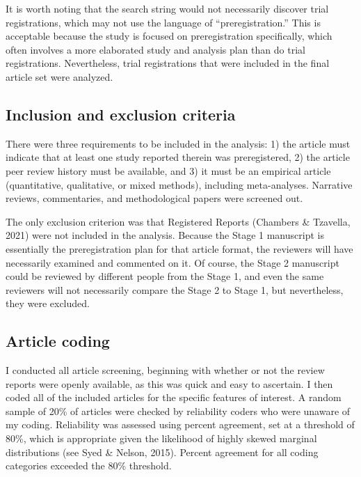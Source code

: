 \documentclass[authordate, empirical]{jote-new-article}
\begin{document}
	It is worth noting that the search string would not necessarily discover trial registrations, which may not use the language of “preregistration.” This is acceptable because the study is focused on preregistration specifically, which often involves a more elaborated study and analysis plan than do trial registrations. Nevertheless, trial registrations that were included in the final article set were analyzed.



	\subsection{Inclusion and exclusion criteria}



	There were three requirements to be included in the analysis: 1) the article must indicate that at least one study reported therein was preregistered, 2) the article peer review history must be available, and 3) it must be an empirical article (quantitative, qualitative, or mixed methods), including meta-analyses. Narrative reviews, commentaries, and methodological papers were screened out.



	The only exclusion criterion was that Registered Reports (Chambers \& Tzavella, 2021) were not included in the analysis. Because the Stage 1 manuscript is essentially the preregistration plan for that article format, the reviewers will have necessarily examined and commented on it. Of course, the Stage 2 manuscript could be reviewed by different people from the Stage 1, and even the same reviewers will not necessarily compare the Stage 2 to Stage 1, but nevertheless, they were excluded.



	\subsection{Article coding}



	I conducted all article screening, beginning with whether or not the review reports were openly available, as this was quick and easy to ascertain. I then coded all of the included articles for the specific features of interest. A random sample of 20\% of articles were checked by reliability coders who were unaware of my coding. Reliability was assessed using percent agreement, set at a threshold of 80\%, which is appropriate given the likelihood of highly skewed marginal distributions (see Syed \& Nelson, 2015). Percent agreement for all coding categories exceeded the 80\% threshold.
\end{document}
